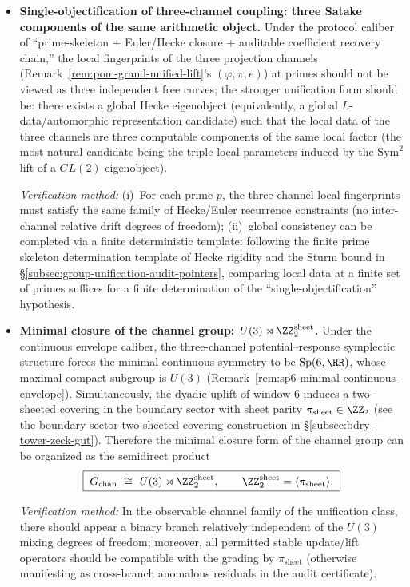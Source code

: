 \begin{itemize}
  \item \textbf{Single-objectification of three-channel coupling: three Satake components of the same arithmetic object.}
  Under the protocol caliber of ``prime-skeleton + Euler/Hecke closure + auditable coefficient recovery chain,'' the local fingerprints of the three projection channels (Remark~\ref{rem:pom-grand-unified-lift}'s \((\varphi,\pi,e)\)) at primes should not be viewed as three independent free curves; the stronger unification form should be: there exists a global Hecke eigenobject (equivalently, a global \(L\)-data/automorphic representation candidate) such that the local data of the three channels are three computable components of the same local factor (the most natural candidate being the triple local parameters induced by the \(\mathrm{Sym}^2\) lift of a \(GL(2)\) eigenobject).
  \par\noindent\emph{Verification method:} (i)~For each prime \(p\), the three-channel local fingerprints must satisfy the same family of Hecke/Euler recurrence constraints (no inter-channel relative drift degrees of freedom); (ii)~global consistency can be completed via a finite deterministic template: following the finite prime skeleton determination template of Hecke rigidity and the Sturm bound in \S\ref{subsec:group-unification-audit-pointers}, comparing local data at a finite set of primes suffices for a finite determination of the ``single-objectification'' hypothesis.

  \item \textbf{Minimal closure of the channel group: \(U(3)\rtimes \ZZ_2^{\mathrm{sheet}}\).}
  Under the continuous envelope caliber, the three-channel potential--response symplectic structure forces the minimal continuous symmetry to be \(\mathrm{Sp}(6,\RR)\), whose maximal compact subgroup is \(U(3)\) (Remark~\ref{rem:sp6-minimal-continuous-envelope}). Simultaneously, the dyadic uplift of window-6 induces a two-sheeted covering in the boundary sector with sheet parity \(\pi_{\mathrm{sheet}}\in\ZZ_2\) (see the boundary sector two-sheeted covering construction in \S\ref{subsec:bdry-tower-zeck-gut}). Therefore the minimal closure form of the channel group can be organized as the semidirect product
  \[
  \boxed{\;
  G_{\mathrm{chan}}\ \cong\ U(3)\rtimes \ZZ_2^{\mathrm{sheet}},
  \qquad \ZZ_2^{\mathrm{sheet}}=\langle \pi_{\mathrm{sheet}}\rangle.
  \;}
  \]
  \par\noindent\emph{Verification method:} In the observable channel family of the unification class, there should appear a binary branch relatively independent of the \(U(3)\) mixing degrees of freedom; moreover, all permitted stable update/lift operators should be compatible with the grading by \(\pi_{\mathrm{sheet}}\) (otherwise manifesting as cross-branch anomalous residuals in the audit certificate).


\end{itemize}
